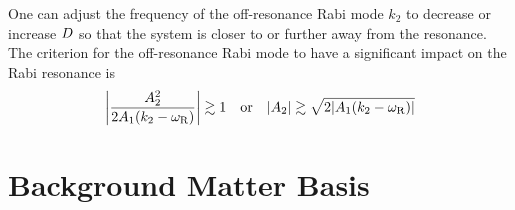 One can adjust the frequency of the off-resonance Rabi mode $k_2$ to decrease or increase $D$ so that the system is closer to or further away from the resonance. The criterion for the off-resonance Rabi mode to have a significant impact on the Rabi resonance is
\begin{equation}
    \left\lvert  \frac{ A_2^2 }{2  A_1 ( k_2 - \omega_{\mathrm R})} \right\rvert \gtrsim 1 \quad \text{or} \quad \lvert A_2\rvert \gtrsim \sqrt{ 2 \lvert A_1 (k_2 - \omega_\RR) \rvert }
    \label{chap:matter-sec:single-frequency-eqn:criterion-for-a2}
\end{equation}




\section{\label{chap:matter-sec:background}Background Matter Basis}



